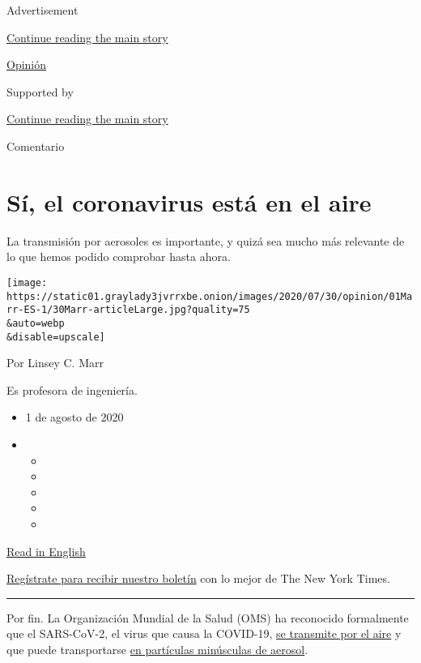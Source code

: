 Advertisement

\protect\hyperlink{after-top}{Continue reading the main story}

\href{/es/section/opinion}{Opinión}

Supported by

\protect\hyperlink{after-sponsor}{Continue reading the main story}

Comentario

\hypertarget{suxed-el-coronavirus-estuxe1-en-el-aire}{%
\section{Sí, el coronavirus está en el
aire}\label{suxed-el-coronavirus-estuxe1-en-el-aire}}

La transmisión por aerosoles es importante, y quizá sea mucho más
relevante de lo que hemos podido comprobar hasta ahora.

\texttt{[image: https://static01.graylady3jvrrxbe.onion/images/2020/07/30/opinion/01Marr-ES-1/30Marr-articleLarge.jpg?quality=75\\\&auto=webp\\\&disable=upscale]}

Por Linsey C. Marr

Es profesora de ingeniería.

\begin{itemize}
\item
  1 de agosto de 2020
\item
  \begin{itemize}
  \item
  \item
  \item
  \item
  \item
  \end{itemize}
\end{itemize}

\href{https://www.nytimes3xbfgragh.onion/2020/07/30/opinion/coronavirus-aerosols.html}{Read
in English}

\href{https://www.nytimes3xbfgragh.onion/newsletters/el-times}{Regístrate
para recibir nuestro boletín} con lo mejor de The New York Times.

\begin{center}\rule{0.5\linewidth}{\linethickness}\end{center}

Por fin. La Organización Mundial de la Salud (OMS) ha reconocido
formalmente que el SARS-CoV-2, el virus que causa la COVID-19,
\href{https://www.nytimes3xbfgragh.onion/2020/07/09/health/virus-aerosols-who.html}{se
transmite por el aire} y que puede transportarse
\href{https://www.nature.com/articles/d41586-020-02058-1}{en partículas
minúsculas de aerosol}.

